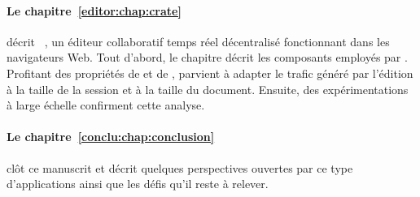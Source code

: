 \paragraph{Le chapitre~\ref{editor:chap:crate}} décrit
\CRATE~\cite{nedelec2016crate}, un éditeur collaboratif temps réel décentralisé
fonctionnant dans les navigateurs Web.  Tout d'abord,
le chapitre décrit les composants employés par \CRATE.  Profitant des propriétés
de \SPRAY et de \LSEQ, \CRATE parvient à adapter le trafic généré par l'édition
à la taille de la session et à la taille du document. Ensuite, des
expérimentations à large échelle confirment cette analyse.

\paragraph{Le chapitre~\ref{conclu:chap:conclusion}} clôt ce manuscrit et décrit
quelques perspectives ouvertes par ce type d'applications ainsi que les défis
qu'il reste à relever.


